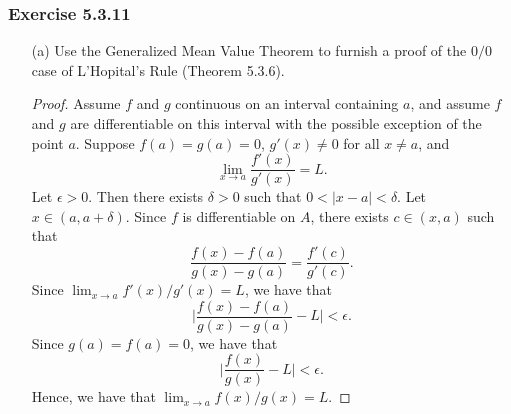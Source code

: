 \subsubsection{Exercise 5.3.11} 
\begin{enumerate}
    \item[(a)] Use the Generalized Mean Value Theorem to furnish a proof of the \( 0/0  \) case of L'Hopital's Rule (Theorem 5.3.6).
        \begin{proof}
        Assume \( f  \) and \( g  \) continuous on an interval containing \( a  \), and assume \( f  \) and \( g  \) are differentiable on this interval with the possible exception of the point \( a  \). Suppose \( f(a) = g(a) = 0  \), \( g'(x) \neq 0 \) for all \( x \neq a  \), and 
        \[  \lim_{ x \to a } \frac{ f'(x)  }{ g'(x) } = L. \]
        Let \( \epsilon > 0  \). Then there exists \( \delta > 0  \) such that \( 0 < | x - a  | < \delta  \). Let \( x \in (a, a + \delta ) \). Since \( f  \) is differentiable on \( A  \), there exists \( c \in (x,a)  \) such that  
        \[  \frac{ f(x) - f(a)  }{ g(x) - g(a)  } = \frac{ f'(c)  }{ g'(c) }.  \]
    Since \( \lim_{ x \to a } f'(x) / g'(x) = L  \), we have that
    \[  \Big|  \frac{ f(x) - f(a)  }{ g(x) - g(a)   } - L \Big| < \epsilon.  \]
    Since \( g(a) = f(a) = 0 \), we have that 
    \[ \Big|  \frac{ f(x)  }{ g(x)  } - L \Big|  < \epsilon.  \]
    Hence, we have that \( \lim_{ x \to a } f(x) / g(x) = L  \).
        \end{proof}
\end{enumerate}





